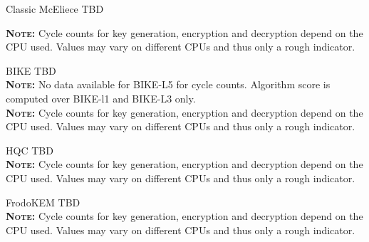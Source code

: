 \documentclass[11pt,english,a4paper, landscape]{scrartcl}
\begin{document}
	\begin{algorithmbox}{Classic McEliece}
		\textcolor{themeblue}{TBD}


		{\tiny  {\bfseries \scshape Note:} Cycle counts for key generation, encryption and decryption depend on the CPU used. Values may vary on different CPUs and thus only a rough indicator.}
	\end{algorithmbox}

	\begin{algorithmbox}{BIKE}
		\textcolor{themeblue}{TBD}\\
		{\tiny  {\bfseries \scshape Note:} No data available for BIKE-L5 for cycle counts. Algorithm score is computed over BIKE-l1 and BIKE-L3 only.}\\
		{\tiny  {\bfseries \scshape Note:} Cycle counts for key generation, encryption and decryption depend on the CPU used. Values may vary on different CPUs and thus only a rough indicator.}

	\end{algorithmbox}

	\begin{algorithmbox}{HQC}
		\textcolor{themeblue}{TBD}\\
		{\tiny  {\bfseries \scshape Note:} Cycle counts for key generation, encryption and decryption depend on the CPU used. Values may vary on different CPUs and thus only a rough indicator.}
	\end{algorithmbox}

	\begin{algorithmbox}{FrodoKEM}
		\textcolor{themeblue}{TBD}\\
		{\tiny  {\bfseries \scshape Note:} Cycle counts for key generation, encryption and decryption depend on the CPU used. Values may vary on different CPUs and thus only a rough indicator.}
	\end{algorithmbox}
\end{document}
